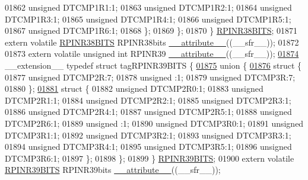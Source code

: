 \begin{DoxyCode}
01862       \textcolor{keywordtype}{unsigned} DTCMP1R1:1;
01863       \textcolor{keywordtype}{unsigned} DTCMP1R2:1;
01864       \textcolor{keywordtype}{unsigned} DTCMP1R3:1;
01865       \textcolor{keywordtype}{unsigned} DTCMP1R4:1;
01866       \textcolor{keywordtype}{unsigned} DTCMP1R5:1;
01867       \textcolor{keywordtype}{unsigned} DTCMP1R6:1;
01868     \};
01869   \};
01870 \} \hyperlink{a00008_d0/d72/a00724}{RPINR38BITS};
01871 \textcolor{keyword}{extern} \textcolor{keyword}{volatile} \hyperlink{a00008_d0/d72/a00724}{RPINR38BITS} RPINR38bits \hyperlink{a00009_a493c46f03454991ccc5aa7a6e1dfb2a7}{\_\_attribute\_\_}((\_\_sfr\_\_));
01872 
01873 \textcolor{keyword}{extern} \textcolor{keyword}{volatile} \textcolor{keywordtype}{unsigned} \textcolor{keywordtype}{int}  RPINR39 \hyperlink{a00009_a493c46f03454991ccc5aa7a6e1dfb2a7}{\_\_attribute\_\_}((\_\_sfr\_\_));
\hypertarget{a00009_source_l01874}{}\hyperlink{a00008}{01874} \_\_extension\_\_ \textcolor{keyword}{typedef} \textcolor{keyword}{struct }tagRPINR39BITS \{
\hypertarget{a00009_source_l01875}{}\hyperlink{a00009}{01875}   \textcolor{keyword}{union }\{
\hypertarget{a00009_source_l01876}{}\hyperlink{a00009}{01876}     \textcolor{keyword}{struct }\{
01877       \textcolor{keywordtype}{unsigned} DTCMP2R:7;
01878       \textcolor{keywordtype}{unsigned} :1;
01879       \textcolor{keywordtype}{unsigned} DTCMP3R:7;
01880     \};
\hypertarget{a00009_source_l01881}{}\hyperlink{a00009}{01881}     \textcolor{keyword}{struct }\{
01882       \textcolor{keywordtype}{unsigned} DTCMP2R0:1;
01883       \textcolor{keywordtype}{unsigned} DTCMP2R1:1;
01884       \textcolor{keywordtype}{unsigned} DTCMP2R2:1;
01885       \textcolor{keywordtype}{unsigned} DTCMP2R3:1;
01886       \textcolor{keywordtype}{unsigned} DTCMP2R4:1;
01887       \textcolor{keywordtype}{unsigned} DTCMP2R5:1;
01888       \textcolor{keywordtype}{unsigned} DTCMP2R6:1;
01889       \textcolor{keywordtype}{unsigned} :1;
01890       \textcolor{keywordtype}{unsigned} DTCMP3R0:1;
01891       \textcolor{keywordtype}{unsigned} DTCMP3R1:1;
01892       \textcolor{keywordtype}{unsigned} DTCMP3R2:1;
01893       \textcolor{keywordtype}{unsigned} DTCMP3R3:1;
01894       \textcolor{keywordtype}{unsigned} DTCMP3R4:1;
01895       \textcolor{keywordtype}{unsigned} DTCMP3R5:1;
01896       \textcolor{keywordtype}{unsigned} DTCMP3R6:1;
01897     \};
01898   \};
01899 \} \hyperlink{a00008_dc/ddc/a00727}{RPINR39BITS};
01900 \textcolor{keyword}{extern} \textcolor{keyword}{volatile} \hyperlink{a00008_dc/ddc/a00727}{RPINR39BITS} RPINR39bits \hyperlink{a00009_a493c46f03454991ccc5aa7a6e1dfb2a7}{\_\_attribute\_\_}((\_\_sfr\_\_));

\end{DoxyCode}
